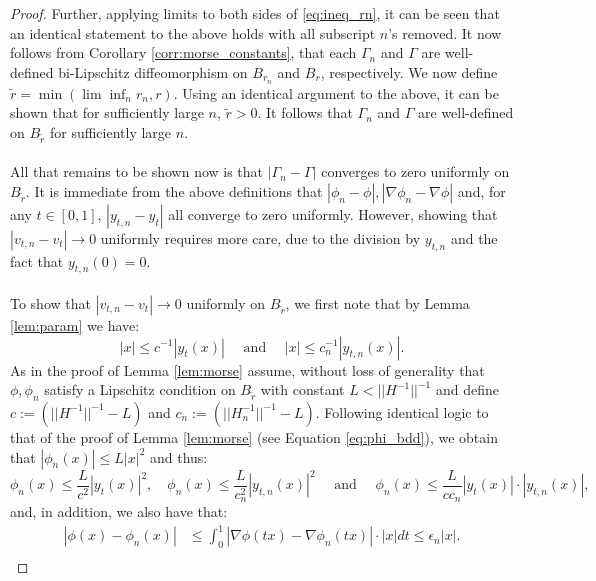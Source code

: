 \documentclass[11pt]{article}
\newcommand{\1}{\mathbf{1}}
\theoremstyle{definition}
\theoremstyle{remark}
\begin{document}
\begin{proof}
\noindent
Further, applying limits to both sides of \eqref{eq:ineq_rn}, it can be seen that an identical statement to the above holds with all subscript $n$'s removed. It now follows from Corollary \ref{corr:morse_constants}, that each $\Gamma_n$ and $\Gamma$ are well-defined bi-Lipschitz diffeomorphism on $B_{r_n}$ and $B_{r}$, respectively. We now define $\tilde{r}=\min(\lim\inf_{n}r_n, r)$. Using an identical argument to the above, it can be shown that for sufficiently large $n$, $\tilde{r}>0$. It follows that $\Gamma_n$ and $\Gamma$ are well-defined on $B_{\tilde{r}}$ for sufficiently large $n$.\\
\\
    All that remains to be shown now is that $|\Gamma_n-\Gamma|$ converges to zero uniformly on $B_{\tilde{r}}$. It is immediate from the above definitions that $|\phi_n-\phi|, |\nabla \phi_n - \nabla \phi|$ and, for any $t\in[0,1]$, $|y_{t,n}-y_t|$ all converge to zero uniformly. However, showing that  $|v_{t,n}-v_t|\rightarrow 0$ uniformly requires more care, due to the division by $y_{t,n}$ and the fact that $y_{t,n}(0)=0$. \\
    \\
    To show that $|v_{t,n}-v_t|\rightarrow 0$ uniformly on $B_{\tilde{r}}$, we first note that by Lemma \ref{lem:param} we have: 
    \begin{equation}\nonumber
        |x|\leq c^{-1}|y_t(x)| \quad \text{ and } \quad |x|\leq c_n^{-1}|y_{t,n}(x)|. 
    \end{equation}
    As in the proof of Lemma \ref{lem:morse} assume, without loss of generality that $\phi,\phi_n$ satisfy a Lipschitz condition on $B_{\tilde{r}}$ with constant $L<||H^{-1}||^{-1}$ and define $c:=(||H^{-1}||^{-1}-L)$ and $c_n:=(||H_n^{-1}||^{-1}-L)$. Following identical logic to that of the proof of Lemma \ref{lem:morse} (see Equation \eqref{eq:phi_bdd}), we obtain that $|\phi_n(x)|\leq L|x|^2$ and thus:
    \begin{equation}\label{eq:phi_bdds}
        \phi_n(x) \leq \frac{L}{c^2}|y_t(x)|^2, \quad \phi_n(x) \leq \frac{L}{c_n^2}|y_{t,n}(x)|^2 \quad \text{ and }\quad \phi_n(x) \leq \frac{L}{cc_n}|y_{t}(x)|\cdot|y_{t,n}(x)|,
    \end{equation}
    and, in addition, we also have that:
    \begin{equation}\label{eq:phi_diff_bdd}
    \begin{split}
        |\phi(x)-\phi_n(x)| & \leq \int_{0}^1 |\nabla \phi(tx) - \nabla \phi_n(tx)|\cdot |x| dt \leq \epsilon_{n}|x|. \\

\end{split}
\end{equation}
\end{proof}
\end{document}
